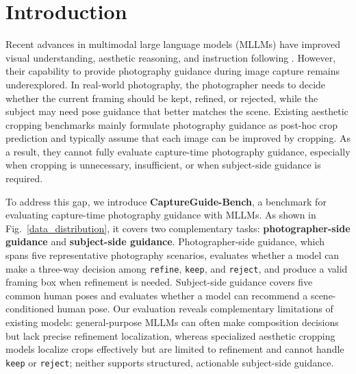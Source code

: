 \documentclass{llmxive}
\begin{document}
\section{Introduction}
\label{sec:intro}

Recent advances in multimodal large language models (MLLMs) have improved visual understanding, aesthetic reasoning, and instruction following \citep{alayrac2022flamingo,li2023blip,dai2023instructblip,zhu2024minigpt,bai2025qwen3,bai2023qwenvlversatilevisionlanguagemodel,liu2023visual,team2023gemini,wang2025internvl3,huang2024aesexpert,qi2025photographer,wu2023q,liu2025advancing,cao2025artimuse}. However, their capability to provide photography guidance during image capture remains underexplored. In real-world photography, the photographer needs to decide whether the current framing should be kept, refined, or rejected, while the subject may need pose guidance that better matches the scene. Existing aesthetic cropping benchmarks \citep{yan2013learning,hong2024learning,yang2023focusing,zeng2019reliable,wei2018good,chen2017quantitative,fang2014automatic,zhang2022human} mainly formulate photography guidance as post-hoc crop prediction and typically assume that each image can be improved by cropping. As a result, they cannot fully evaluate capture-time photography guidance, especially when cropping is unnecessary, insufficient, or when subject-side guidance is required.

To address this gap, we introduce \textbf{CaptureGuide-Bench}, a benchmark for evaluating capture-time photography guidance with MLLMs. As shown in Fig.~\ref{data_distribution}, it covers two complementary tasks: \textbf{photographer-side guidance} and \textbf{subject-side guidance}. Photographer-side guidance, which spans five representative photography scenarios, evaluates whether a model can make a three-way decision among \texttt{refine}, \texttt{keep}, and \texttt{reject}, and produce a valid framing box when refinement is needed. Subject-side guidance covers five common human poses and evaluates whether a model can recommend a scene-conditioned human pose. Our evaluation reveals complementary limitations of existing models: general-purpose MLLMs \citep{wang2025internvl3,bai2025qwen3,team2023gemini,achiam2023gpt,moonshotai2025kimik26} can often make composition decisions but lack precise refinement localization, whereas specialized aesthetic cropping models \citep{sheng2025instructcrop,du2026venus,hong2021composing,liu2023beyond} localize crops effectively but are limited to refinement and cannot handle \texttt{keep} or \texttt{reject}; neither supports structured, actionable subject-side guidance.
\end{document}
